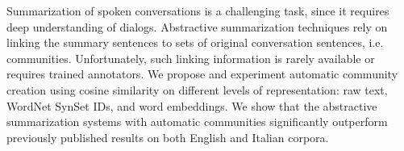Summarization of spoken conversations is a challenging task, since it requires deep understanding of dialogs. Abstractive summarization techniques rely on linking the summary sentences to sets of original conversation sentences, i.e. communities. Unfortunately, such linking information is rarely available or requires trained annotators. We propose and experiment automatic community creation using cosine similarity on different levels of representation: raw text, WordNet SynSet IDs, and word embeddings. We show that the abstractive summarization systems with automatic communities significantly outperform previously published results on both English and Italian corpora.

